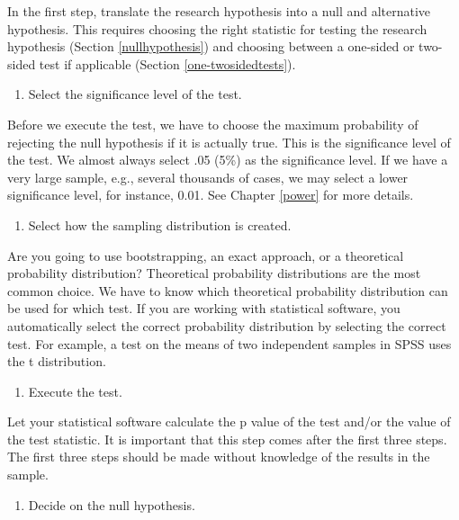 \documentclass[a4paper]{book}
\providecommand{\tightlist}{%
  \setlength{\itemsep}{0pt}\setlength{\parskip}{0pt}}
\theoremstyle{definition}
\theoremstyle{definition}
\theoremstyle{definition}
\theoremstyle{remark}
\begin{document}
In the first step, translate the research hypothesis into a null and
alternative hypothesis. This requires choosing the right statistic for
testing the research hypothesis (Section \ref{nullhypothesis}) and
choosing between a one-sided or two-sided test if applicable (Section
\ref{one-twosidedtests}).

\begin{enumerate}
\def\labelenumi{\arabic{enumi}.}
\setcounter{enumi}{1}
\tightlist
\item
  Select the significance level of the test.
\end{enumerate}

Before we execute the test, we have to choose the maximum probability of
rejecting the null hypothesis if it is actually true. This is the
significance level of the test. We almost always select .05 (5\%) as the
significance level. If we have a very large sample, e.g., several
thousands of cases, we may select a lower significance level, for
instance, 0.01. See Chapter \ref{power} for more details.

\begin{enumerate}
\def\labelenumi{\arabic{enumi}.}
\setcounter{enumi}{2}
\tightlist
\item
  Select how the sampling distribution is created.
\end{enumerate}

Are you going to use bootstrapping, an exact approach, or a theoretical
probability distribution? Theoretical probability distributions are the
most common choice. We have to know which theoretical probability
distribution can be used for which test. If you are working with
statistical software, you automatically select the correct probability
distribution by selecting the correct test. For example, a test on the
means of two independent samples in SPSS uses the t distribution.

\begin{enumerate}
\def\labelenumi{\arabic{enumi}.}
\setcounter{enumi}{3}
\tightlist
\item
  Execute the test.
\end{enumerate}

Let your statistical software calculate the p value of the test and/or
the value of the test statistic. It is important that this step comes
after the first three steps. The first three steps should be made
without knowledge of the results in the sample.

\begin{enumerate}
\def\labelenumi{\arabic{enumi}.}
\setcounter{enumi}{4}
\tightlist
\item
  Decide on the null hypothesis.
\end{enumerate}
\end{document}
